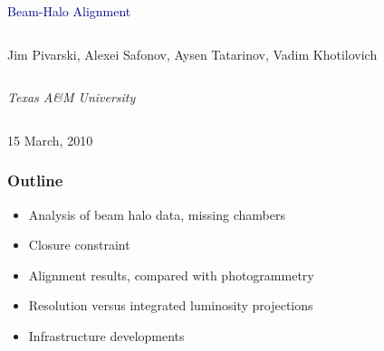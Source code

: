 \documentclass[compress]{beamer}
\begin{document}
\begin{frame}
\vfill
\begin{center}
\textcolor{darkblue}{\Large Beam-Halo Alignment}

\vfill
\begin{columns}
\begin{center}
\large
Jim Pivarski, Alexei Safonov, Aysen Tatarinov, Vadim Khotilovich
\end{center}
\end{columns}

\begin{columns}
\begin{center}
\scriptsize
{\it Texas A\&M University}
\end{center}
\end{columns}

\vfill
15 March, 2010

\end{center}
\end{frame}


\small

\begin{frame}
\frametitle{Outline}
\begin{itemize}\setlength{\itemsep}{0.5 cm}
\item Analysis of beam halo data, missing chambers

\item Closure constraint

\item Alignment results, compared with photogrammetry

\item Resolution versus integrated luminosity projections

\item Infrastructure developments

\end{itemize}
\end{frame}
\end{document}
